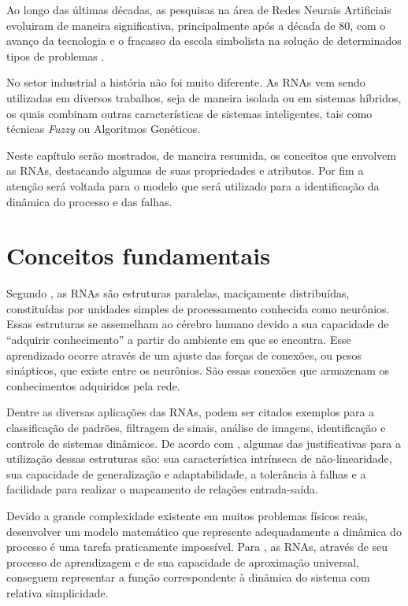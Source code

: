 \label{cap:rnas}

Ao longo das últimas décadas, as pesquisas na área de Redes Neurais Artificiais
evoluiram de maneira significativa, principalmente após a década de 80, com o
avanço da tecnologia e o fracasso da escola simbolista na solução de
determinados tipos de problemas \cite{braga:2007}.

No setor industrial a história não foi muito diferente. As RNAs vem sendo
utilizadas em diversos trabalhos, seja de maneira isolada ou em sistemas
híbridos, os quais combinam outras características de sistemas inteligentes,
tais como técnicas {\it Fuzzy} ou Algoritmos Genéticos.

Neste capítulo serão mostrados, de maneira resumida, os conceitos que envolvem
as RNAs, destacando algumas de suas propriedades e atributos. Por fim a atenção
será voltada para o modelo que será utilizado para a identificação da dinâmica
do processo e das falhas.

\section{Conceitos fundamentais}
Segundo , as RNAs são estruturas paralelas, maciçamente
distribuídas, constituídas por unidades simples de processamento conhecida como
neurônios. Essas estruturas se assemelham ao cérebro humano devido a sua
capacidade de ``adquirir conhecimento'' a partir do ambiente em que se encontra.
Esse aprendizado ocorre através de um ajuste das forças de conexões, ou pesos
sinápticos, que existe entre os neurônios. São essas conexões que armazenam os
conhecimentos adquiridos pela rede.

Dentre as diversas aplicações das RNAs, podem ser citados exemplos para a
classificação de padrões, filtragem de sinais, análise de imagens, identificação
e controle de sistemas dinâmicos. De acordo com ,
algumas das justificativas para a utilização dessas estruturas são: sua
característica intrínseca de não-linearidade, sua capacidade de generalização e
adaptabilidade, a tolerância à falhas e a facilidade para realizar o mapeamento
de relações entrada-saída.

Devido a grande complexidade existente em muitos problemas físicos reais,
desenvolver um modelo matemático que represente adequadamente a dinâmica do
processo é uma tarefa praticamente impossível. Para ,
as RNAs, através de seu processo de aprendizagem e de sua capacidade de
aproximação universal, conseguem representar a função correspondente à dinâmica
do sistema com relativa simplicidade.

